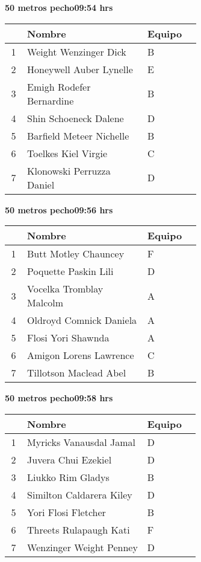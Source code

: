 \begin{minipage}{0.95\linewidth}
\begin{center}
\textbf{
50 metros pecho\hspace{1cm}09:54 hrs}
\end{center}
\begin{tabular}{cp{0.63\linewidth}l}
\hline
& \textbf{Nombre} & \textbf{Equipo} \\ \hline
1 & Weight Wenzinger Dick & B \\ 
2 & Honeywell Auber Lynelle & E \\ 
3 & Emigh Rodefer Bernardine & B \\ 
4 & Shin Schoeneck Dalene & D \\ 
5 & Barfield Meteer Nichelle & B \\ 
6 & Toelkes Kiel Virgie & C \\ 
7 & Klonowski Perruzza Daniel & D \\ 
\end{tabular}
\end{minipage}
\begin{minipage}{0.95\linewidth}
\begin{center}
\textbf{
50 metros pecho\hspace{1cm}09:56 hrs}
\end{center}
\begin{tabular}{cp{0.63\linewidth}l}
\hline
& \textbf{Nombre} & \textbf{Equipo} \\ \hline
1 & Butt Motley Chauncey & F \\ 
2 & Poquette Paskin Lili & D \\ 
3 & Vocelka Tromblay Malcolm & A \\ 
4 & Oldroyd Comnick Daniela & A \\ 
5 & Flosi Yori Shawnda & A \\ 
6 & Amigon Lorens Lawrence & C \\ 
7 & Tillotson Maclead Abel & B \\ 
\end{tabular}
\end{minipage}
\begin{minipage}{0.95\linewidth}
\begin{center}
\textbf{
50 metros pecho\hspace{1cm}09:58 hrs}
\end{center}
\begin{tabular}{cp{0.63\linewidth}l}
\hline
& \textbf{Nombre} & \textbf{Equipo} \\ \hline
1 & Myricks Vanausdal Jamal & D \\ 
2 & Juvera Chui Ezekiel & D \\ 
3 & Liukko Rim Gladys & B \\ 
4 & Similton Caldarera Kiley & D \\ 
5 & Yori Flosi Fletcher & B \\ 
6 & Threets Rulapaugh Kati & F \\ 
7 & Wenzinger Weight Penney & D \\ 
\end{tabular}
\end{minipage}
